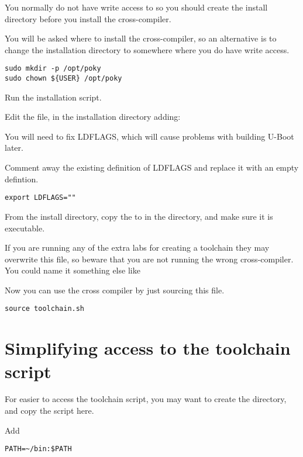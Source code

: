 You normally do not have write access to  so you should
create the install directory before you install the cross-compiler.

You will be asked where to install the cross-compiler, so an alternative 
is to change the installation directory to somewhere where you do have write access.

\begin{verbatim}
sudo mkdir -p /opt/poky
sudo chown ${USER} /opt/poky
\end{verbatim}

Run the installation script.

Edit the  file, 
in the installation directory adding:

You will need to fix LDFLAGS, which will cause problems with building U-Boot later.

Comment away the existing definition of LDFLAGS and replace it with an empty defintion.

\begin{verbatim}
export LDFLAGS=""
\end{verbatim}

From the install directory, copy the 
 to
 in the \labdir directory, and make sure it is executable.

If you are running any of the extra labs for creating a toolchain
they may overwrite this file, so beware that you are not running
the wrong cross-compiler. You could name it something else like

Now you can use the cross compiler by just sourcing this file.

\begin{verbatim}
source toolchain.sh
\end{verbatim}

\section{Simplifying access to the toolchain script}

For easier to access the toolchain script,
you may want to create the  directory,
and copy the script here.

Add 

\begin{verbatim}
PATH=~/bin:$PATH
\end{verbatim}

